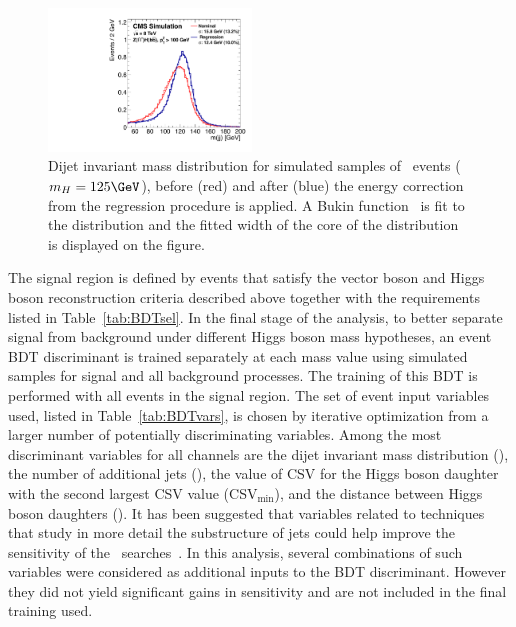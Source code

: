 \documentclass[11pt,twoside,a4paper,cmspaper,final,collab]{cms-tdr}
\begin{document}
\begin{figure}[tbhp]
 \begin{center}
    \includegraphics[width=0.48\textwidth]{Hmass_Regression_Simulation_Oct08.pdf}
    \caption{Dijet invariant mass distribution for simulated samples of \ZllHbb\ events ($m_{H} = 125\GeV$), before (red) and after (blue) the energy correction from the
regression procedure is applied. A Bukin function~\cite{Verkerke:2003ir} is fit to the distribution and the fitted width of the core of the distribution is displayed on the figure.
    }
    \label{fig:regression_VV_VH}
  \end{center}
\end{figure}



The signal region is defined by events that satisfy the vector boson and Higgs boson reconstruction criteria
described above together with the requirements listed in Table~\ref{tab:BDTsel}.
In the final stage of the analysis, to better separate signal from background under
different Higgs boson mass hypotheses, an event BDT discriminant is trained separately at
each mass value using simulated samples for signal and all background
processes. The training of this BDT is performed with all events in the signal region.
The set of event input variables used, listed in Table~\ref{tab:BDTvars},  is chosen by iterative optimization from a larger number of
potentially discriminating variables. Among the most discriminant
variables for all channels are the dijet invariant mass distribution
(\Mjj), the number of additional jets (\Naj), the value of CSV for the
Higgs boson daughter
with the second largest CSV value (CSV$_{\text{min}}$), and the
distance between Higgs boson daughters (\dRJJ). It has been suggested that variables related to techniques
that study in more detail the substructure of jets could help improve
the sensitivity of the \HBB\ searches~\cite{PhysRevLett.100.242001}. %
In this analysis, several combinations of such variables were
considered as additional inputs
to the BDT discriminant. However they did not yield significant gains in
sensitivity and  are not included in the final training used.
\end{document}
